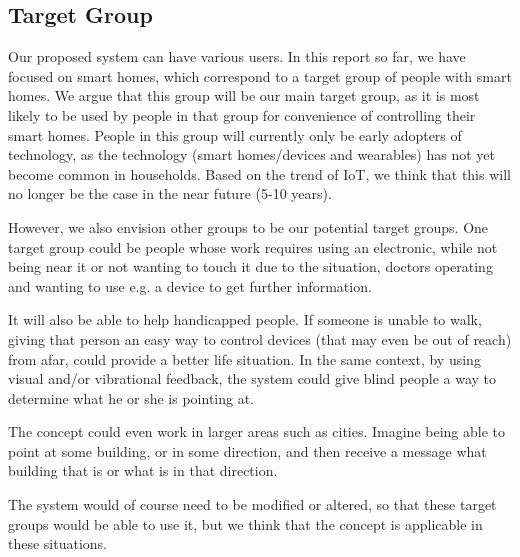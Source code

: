 \subsection{Target Group}
Our proposed system can have various users. 
In this report so far, we have focused on smart homes, 
which correspond to a target group of people with smart homes. 
We argue that this group will be our main target group, 
as it is most likely to be used by people in that group for convenience of controlling their smart homes. 
People in this group will currently only be early adopters of technology, 
as the technology (smart homes/devices and wearables) has not yet become common in households.
Based on the trend of IoT, we think that this will no longer be the case in the near future (5-10 years). 
 
However, we also envision other groups to be our potential target groups.
One target group could be people whose work requires using an electronic, 
while not being near it or not wanting to touch it due to the situation,
\eg doctors operating and wanting to use e.g. a device to get further information.

It will also be able to help handicapped people. 
If someone is unable to walk, 
giving that person an easy way to control devices (that may even be out of reach) from afar, 
could provide a better life situation. 
In the same context, by using visual and/or vibrational feedback, 
the system could give blind people a way to determine what he or she is pointing at. 

The concept could even work in larger areas such as cities. 
Imagine being able to point at some building, or in some direction, 
and then receive a message what building that is or what is in that direction. 

The system would of course need to be modified or altered, 
so that these target groups would be able to use it, 
but we think that the concept is applicable in these situations. 
 
